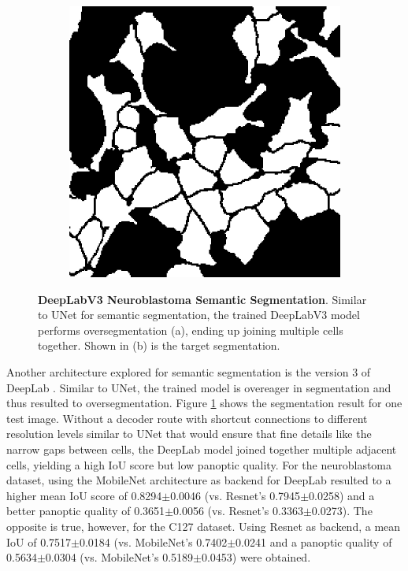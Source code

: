 \documentclass[10pt, journal, compsoc]{IEEEtran}
\begin{document}
\begin{figure}
\begin{subfigure}[b]{0.45\linewidth}
\includegraphics[width=\linewidth]{unet/110115.jpg}
\caption{}
\end{subfigure}
\caption{\textbf{DeepLabV3 Neuroblastoma Semantic Segmentation}. Similar to UNet for semantic segmentation, the trained DeepLabV3 model performs oversegmentation (a), ending up joining multiple cells together. Shown in (b) is the target segmentation.}
\label{fig:deeplab_results}
\end{figure}
Another architecture explored for semantic segmentation is the version 3 of DeepLab \cite{DBLP:journals/corr/ChenPSA17}. Similar to UNet, the trained model is overeager in segmentation and thus resulted to oversegmentation. Figure \ref{fig:deeplab_results} shows the segmentation result for one test image. Without a decoder route with shortcut connections to different resolution levels similar to UNet that would ensure that fine details like the narrow gaps between cells, the DeepLab model joined together multiple adjacent cells, yielding a high IoU score but low panoptic quality. For the neuroblastoma dataset, using the MobileNet architecture as backend for DeepLab resulted to a higher mean IoU score of 0.8294$\pm$0.0046 (vs. Resnet's 0.7945$\pm$0.0258) and a better panoptic quality of 0.3651$\pm$0.0056 (vs. Resnet's 0.3363$\pm$0.0273). The opposite is true, however, for the C127 dataset. Using Resnet as backend, a mean IoU of 0.7517$\pm$0.0184 (vs. MobileNet's 0.7402$\pm$0.0241 and a panoptic quality of 0.5634$\pm$0.0304 (vs. MobileNet's 0.5189$\pm$0.0453) were obtained.
\end{document}
